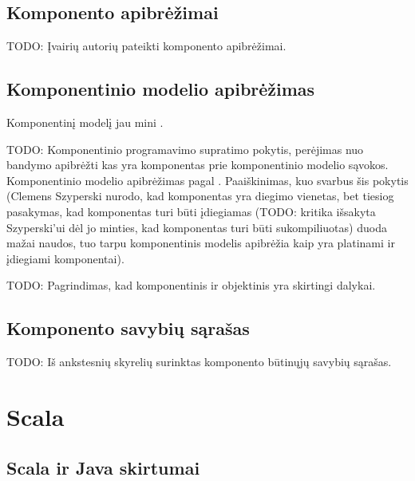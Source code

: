 \section{Komponento apibrėžimai}

TODO: Įvairių autorių pateikti komponento apibrėžimai.

\section{Komponentinio modelio apibrėžimas}

Komponentinį modelį jau mini
\cite[4]{cs-beyond-object-oriented-programming}.

TODO: Komponentinio programavimo supratimo pokytis, perėjimas nuo
bandymo apibrėžti kas yra komponentas prie komponentinio modelio
sąvokos. Komponentinio modelio apibrėžimas pagal
\cite{classification-framework-for-scm}. Paaiškinimas, kuo svarbus šis
pokytis (Clemens Szyperski nurodo, kad komponentas yra diegimo
vienetas\cite{cs-beyond-object-oriented-programming}, bet tiesiog
pasakymas, kad komponentas turi būti įdiegiamas (TODO: kritika
išsakyta Szyperski'ui dėl jo minties, kad komponentas turi būti
sukompiliuotas) duoda mažai naudos, tuo tarpu komponentinis
modelis apibrėžia kaip yra platinami ir įdiegiami komponentai).

TODO: Pagrindimas, kad komponentinis ir objektinis yra skirtingi
dalykai.

\section{Komponento savybių sąrašas}

TODO: Iš ankstesnių skyrelių surinktas komponento būtinųjų savybių
sąrašas.

\chapter{Scala}

\section{Scala ir Java skirtumai}

